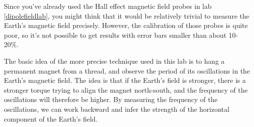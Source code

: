 \label{earth-field-precision}

\apparatus
{}


\observations

Since you've already used the Hall effect magnetic field probes in
lab \ref{dipolefieldlab},
you might think that it would be relatively trivial to measure the Earth's magnetic field
precisely. However, the calibration of those probes is quite poor, so it's not possible
to get results with error bars smaller than about 10-20\%.


The basic idea of the more precise technique used in this lab is to hang a permanent magnet
from a thread, and observe the period of its oscillations
in the Earth's magnetic field. The idea is that if the Earth's
field is stronger, there is a stronger torque trying to align the magnet north-south,
and the frequency of the oscillations will therefore be higher. By measuring the
frequency of the oscillations, we can work backward and infer the strength of the
horizontal component of the Earth's field.


